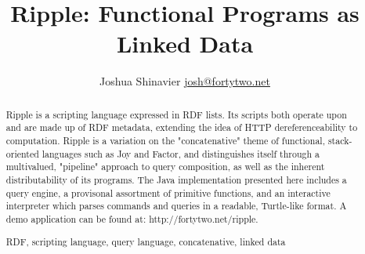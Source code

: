\documentclass[runningheads]{llncs}
\newcommand{\keywords}[1]{\par\addvspace\baselineskip
\noindent\keywordname\enspace\ignorespaces#1}
\begin{document}
\mainmatter  %


\title{Ripple: Functional Programs as Linked Data}


%
%
\author{
Joshua Shinavier
\newline
\url{josh@fortytwo.net}}
%


%
%

\maketitle


\begin{abstract}
Ripple is a scripting language expressed in RDF lists.  Its scripts both operate upon and are made up of RDF metadata, extending the idea of HTTP dereferenceability to computation.  Ripple is a variation on the "concatenative" theme of functional, stack-oriented languages such as Joy and Factor, and distinguishes itself through a multivalued, "pipeline" approach to query composition, as well as the inherent distributability of its programs.  The Java implementation presented here includes a query engine, a provisonal assortment of primitive functions, and an interactive interpreter which parses commands and queries in a readable, Turtle-like format.  A demo application can be found at:
    http://fortytwo.net/ripple.
\keywords{RDF, scripting language, query language, concatenative, linked data}
\end{abstract}
\end{document}
